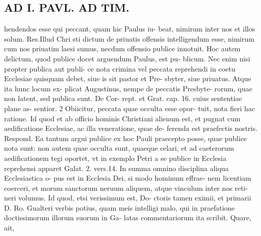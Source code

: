 \documentclass{article}
\begin{document}
\begin{pages}
\section*{AD I. PAVL. AD TIM. }
\marginpar{[ p.Jle ]}\pstart hendendos esse qui peccant, quam hic Paulus iu- beat, nimirum inter nos et illos solum. Res.Illud Chri sti dictum de priuatis offensis intelligendum esse, nimirum cum nos priuatim laesi sumus, necdum offensio publice innotuit. Hoc autem delictum, quod publice docet arguendum Paulus, est pu- blicum. Nec enim nisi propter publica aut publi- ce nota crimina vel peccata reprehendi in coetu Ecclesiae quisquam debet, siue is sit pastor et Pre- sbyter, siue priuatus. Atque ita hunc locum ex- plicat Augustinus, nempe de peccatis Presbyte- rorum, quae non latent, sed publica sunt. De Cor- rept. et Grat. cap. 16. cuius sententiae plane as- sentior. 2 Obiicitur, peccata quae occulta esse opor- tuit, nota fieri hac ratione. Id quod et ab officio hominis Christiani alienum est, et pugnat cum aedificatione Ecclesiae, ac illa veneratione, quae de- ferenda est praefectis nostris. Respond. Ea tantum argui publice ex hoc Pauli praecepto posse, quae publice nota sunt: non autem quae occulta sunt, quaeque celari, et ad caeterorum aedificationem tegi oportet, vt in exemplo Petri a se publice in Ecclesia reprehensi apparet Galat. 2. vers.14. In summa omnino disciplina aliqua Ecclesiastica o- pus est in Ecclesia Dei, si modo hominum effrae- nem licentiam coerceri, et morum sanctorum neruum aliquem, atque vinculum inter nos reti- neri volumus. Id quod, etsi verissimum est, Do- ctoris tamen eximii, et primarii D. Ro. Gualteri verbis potius, quam meis intelligi malo, qui in praefatione doctissimorum illorum suorum in Ga- latas commentariorum ita scribit. Quare, ait,  \pend

\end{pages}
\end{document}

